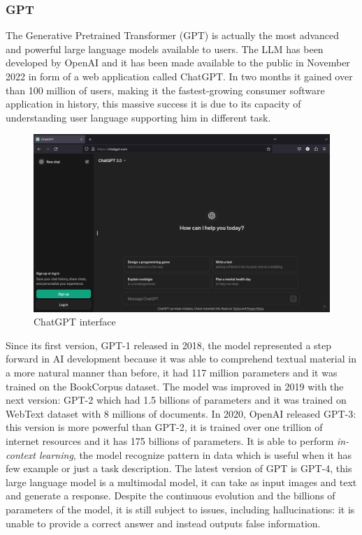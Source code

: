 \subsubsection{GPT}
The Generative Pretrained Transformer (GPT) is actually the most advanced and powerful large language models available to users. The LLM has been developed by OpenAI and it has been made available to the public in November 2022 in form of a web application called ChatGPT. In two months it gained over than 100 million of users, making it the  fastest-growing consumer software application in history, this massive success it is due to its capacity of understanding user language supporting him in different task.\cite{chatgpt_wiki} 
\begin{figure}[H]
    \centering
    \includegraphics[width=0.9\linewidth]{Figures/fig_18.png}
    \caption{ChatGPT interface}
    \label{fig:enter-label}
\end{figure}
Since its first version, GPT-1 released in 2018, the model represented a step forward in AI development because it was able to comprehend textual material in a more natural manner than before, it had 117 million parameters and it was trained on the BookCorpus dataset. The model was improved in 2019 with the next version: GPT-2 which had 1.5 billions of parameters and it was trained on WebText dataset with 8 millions of documents.\cite{radford2019language} In 2020, OpenAI released GPT-3: this version is more powerful than GPT-2, it is trained over one trillion of internet resources and it has 175 billions of parameters. It is able to perform \textit{in-context learning}, the model recognize pattern in data which is useful when it has few example or just a task description. \cite{journey_gpt}
The latest version of GPT is GPT-4, this large language model is a multimodal model, it can take as input images and text and generate a response. Despite the continuous evolution and the billions of parameters of the model, it is still subject to issues, including hallucinations: it is unable to provide a correct answer and instead outputs false information.\cite{achiam2023gpt}
